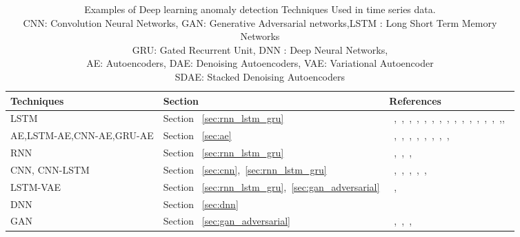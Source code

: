 \begin{table*}
\begin{center}
\caption{Examples of Deep learning anomaly detection Techniques Used in time series data.
        \\CNN: Convolution Neural Networks, GAN: Generative Adversarial networks,LSTM : Long Short Term Memory Networks
        \\GRU: Gated Recurrent Unit, DNN : Deep Neural Networks,
        \\AE: Autoencoders, DAE: Denoising Autoencoders, VAE: Variational Autoencoder
        \\ SDAE: Stacked Denoising Autoencoders}
  \label{tab:sensorAnomalyDetect}
    \begin{tabular}{ | l | p{2cm} | p{6cm} |}
    \hline
    \textbf{Techniques}  & \textbf{Section} & \textbf{References} \\ \hline
     LSTM & Section ~\ref{sec:rnn_lstm_gru} &  ~\cite{shipmon2017time},~\cite{hundman2018detecting},~\cite{zhu2017deep},~\cite{hundman2018detecting},~\cite{malhotra2015long},~\cite{chauhan2015anomaly},~\cite{assendorp2017deep},~\cite{buda2018deepad},~\cite{ahmad2017unsupervised},~\cite{malhotra2016lstm},~\cite{bontemps2016collective},~\cite{taylor2016anomaly},~\cite{cheng2016ms},~\cite{loganathan2018sequence},~\cite{chauhan2015anomaly},\cite{malhotra2015long},~\cite{gorokhov2017convolutional}\\\hline
     AE,LSTM-AE,CNN-AE,GRU-AE & Section ~\ref{sec:ae} & ~\cite{Dominique},~\cite{kieu2018outlier},~\cite{cowton2018combined},~\cite{malhotra2016multi},~\cite{malhotra2016lstm},~\cite{filonov2016multivariate},~\cite{sugimoto2018deep},~\cite{oh2018residual},~\cite{ebrahimzadehmulti}\\\hline
     RNN & Section ~\ref{sec:rnn_lstm_gru} & ~\cite{wielgosz2017recurrent},~\cite{saurav2018online},~\cite{wielgosz2018model},~\cite{guo2016robust}\\\hline
     CNN, CNN-LSTM & Section ~\ref{sec:cnn},~\ref{sec:rnn_lstm_gru} & ~\cite{kanarachos2017detecting},~\cite{dumodeling},~\cite{gorokhov2017convolutional},~\cite{napoletano2018anomaly},~\cite{shanmugam2018jiffy},\cite{medel2016anomaly}\\\hline
     LSTM-VAE & Section ~\ref{sec:rnn_lstm_gru},~\ref{sec:gan_adversarial} & ~\cite{park2018multimodal},~\cite{solch2016variational}\\\hline
     DNN &Section ~\ref{sec:dnn} & ~\cite{amarasinghe2018toward}\\\hline
     GAN &Section ~\ref{sec:gan_adversarial} & ~\cite{li2018anomaly},~\cite{zenati2018efficient},~\cite{lim2018doping},~\cite{laptevanogen}\\\hline
    \end{tabular}
\end{center}
\end{table*}



